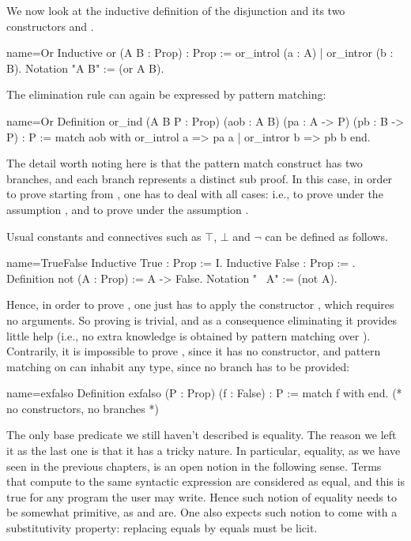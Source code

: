 We now look at the inductive definition of the disjunction 
and its two constructors  and .

\begin{coq}{name=Or}{}
Inductive or (A B : Prop) : Prop := or_introl (a : A) | or_intror (b : B).
Notation "A \/ B" := (or A B).
\end{coq}

The elimination rule can again be expressed by pattern matching:

\begin{coq}{name=Or}{}
Definition or_ind (A B P : Prop)
  (aob : A \/ B) (pa : A -> P) (pb : B -> P) : P :=
  match aob with or_introl a => pa a | or_intror b => pb b end.
\end{coq}

The detail worth noting here is that the pattern match construct has two
branches, and each branch represents a distinct sub proof.  In this
case, in order to prove  starting from ,
one has to deal with all cases: i.e., to prove  under the
assumption , and to prove 
under the assumption .

Usual constants and connectives such as $\top$, $\bot$ and $\neg$
can be defined as follows.

\begin{coq}{name=TrueFalse}{}
Inductive True : Prop := I.
Inductive False : Prop := .
Definition not (A : Prop) := A -> False.
Notation "~ A" := (not A).
\end{coq}

Hence, in order to prove , one just has to apply the
constructor , which requires no arguments.
So proving  is trivial, and as a consequence eliminating it
provides little help (i.e., no extra knowledge is obtained by pattern matching
over ).  Contrarily, it is impossible to prove , since it has no
constructor, and pattern matching on  can inhabit any type, since no
branch has to be provided:

\begin{coq}{name=exfalso}{}
Definition exfalso (P : Prop) (f : False) : P :=
  match f with end.  (* no constructors, no branches *)
\end{coq}

The only base predicate we still haven't described is equality.  The reason we
left it as the last one is that it has a tricky nature.  In particular,
equality, as we have seen in the previous chapters, is an open notion
in the following sense.  Terms that compute to the same syntactic expression
are considered as equal, and this is true for any program the user may write.
Hence such notion of equality needs to be somewhat primitive, as
 and  are.  One also expects such notion to come
with a substitutivity property: replacing equals by equals must be licit.

